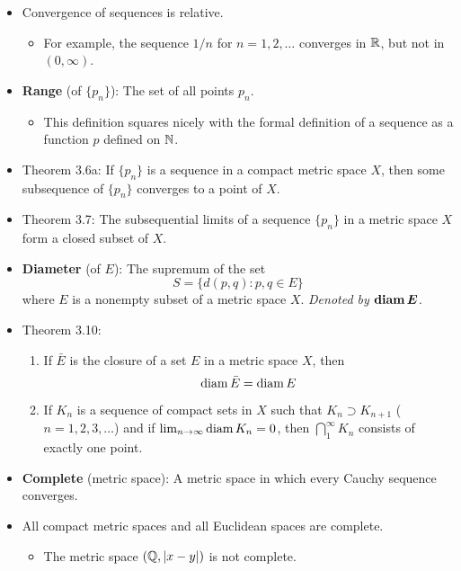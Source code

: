 \documentclass[../../notes.tex]{subfiles}
\begin{document}
\begin{itemize}
    \item {}Convergence of sequences is relative.
    \begin{itemize}
        \item For example, the sequence $1/n$ for $n=1,2,\dots$ converges in $\mathbb{R}$, but not in $(0,\infty)$.
    \end{itemize}
    \item \textbf{Range} (of $\{p_n\}$): The set of all points $p_n$.
    \begin{itemize}
        \item This definition squares nicely with the formal definition of a sequence as a function $p$ defined on $\mathbb{N}$.
    \end{itemize}
    \item Theorem 3.6a: If $\{p_n\}$ is a sequence in a compact metric space $X$, then some subsequence of $\{p_n\}$ converges to a point of $X$.
    \item Theorem 3.7: The subsequential limits of a sequence $\{p_n\}$ in a metric space $X$ form a closed subset of $X$.
    \item \textbf{Diameter} (of $E$): The supremum of the set
    \begin{equation*}
        S = \{d(p,q):p,q\in E\}
    \end{equation*}
    where $E$ is a nonempty subset of a metric space $X$. \emph{Denoted by} $\bm{\diam E}$.
    \item Theorem 3.10:
    \begin{enumerate}[label={(\alph*)}]
        \item If $\bar{E}$ is the closure of a set $E$ in a metric space $X$, then
        \begin{equation*}
            \operatorname{diam}\bar{E} = \operatorname{diam} E
        \end{equation*}
        \item If $K_n$ is a sequence of compact sets in $X$ such that $K_n\supset K_{n+1}$ ($n=1,2,3,\dots$) and if $\lim_{n\to\infty}\operatorname{diam} K_n=0$, then $\bigcap_1^\infty K_n$ consists of exactly one point.
    \end{enumerate}
    \item \textbf{Complete} (metric space): A metric space in which every Cauchy sequence converges.
    \item All compact metric spaces and all Euclidean spaces are complete.
    \begin{itemize}
        \item The metric space $(\mathbb{Q},|x-y|)$ is not complete.

\end{itemize}
\end{itemize}
\end{document}
